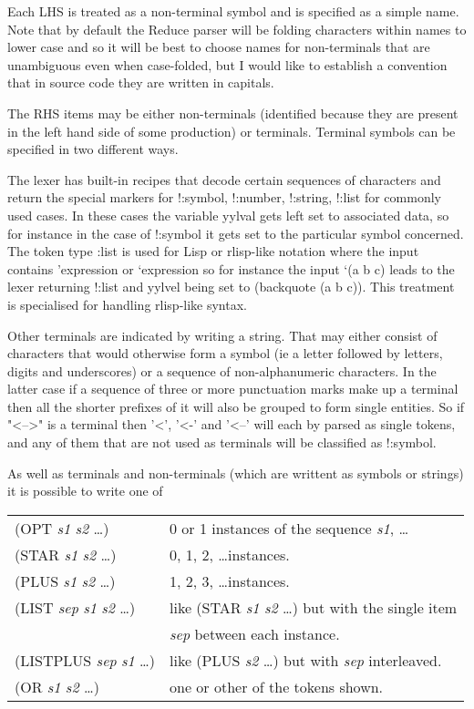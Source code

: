 Each LHS is treated as a non-terminal symbol and is specified as a simple
name. Note that by default the Reduce parser will be folding characters
within names to lower case and so it will be best to choose names for
non-terminals that are unambiguous even when case-folded, but I would like
to establish a convention that in source code they are written in capitals.

The RHS items may be either non-terminals (identified because they are
present in the left hand side of some production) or terminals. Terminal
symbols can be specified in two different ways.

The lexer has built-in recipes that decode certain sequences of characters
and return the special markers for !:symbol, !:number, !:string, !:list for
commonly used cases. In these cases the variable yylval gets left set
to associated data, so for instance in the case of !:symbol it gets set
to the particular symbol concerned.
The token type :list is used for Lisp or rlisp-like notation where the
input contains
    'expression
or  `expression
so for instance the input `(a b c) leads to the lexer returning !:list and
yylvel being set to (backquote (a b c)). This treatment is specialised for
handling rlisp-like syntax.

Other terminals are indicated by writing a string. That may either
consist of characters that would otherwise form a symbol (ie a letter
followed by letters, digits and underscores) or a sequence of
non-alphanumeric characters. In the latter case if a sequence of three or
more punctuation marks make up a terminal then all the shorter prefixes
of it will also be grouped to form single entities. So if "<-->" is a
terminal then '<', '<-' and '<--' will each by parsed as single tokens, and
any of them that are not used as terminals will be classified as !:symbol.

As well as terminals and non-terminals (which are writtent as symbols or
strings) it is possible to write one of

\begin{tabular}{l l}
    ({\ttfamily OPT} \textit{s1} \textit{s2} \ldots)      &     0 or 1 instances of the sequence \textit{s1}, \ldots \\
    ({\ttfamily STAR} \textit{s1} \textit{s2} \ldots)     &     0, 1, 2, \ldots instances. \\
    ({\ttfamily PLUS} \textit{s1} \textit{s2} \ldots)     &     1, 2, 3, \ldots instances. \\
    ({\ttfamily LIST} \textit{sep} \textit{s1} \textit{s2} \ldots) &     like ({\ttfamily STAR} \textit{s1} \textit{s2} \ldots) but with the single item \\
                            &     \textit{sep} between each instance. \\
    ({\ttfamily LISTPLUS} \textit{sep} \textit{s1} \ldots) &    like ({\ttfamily PLUS} \textit{s2} \ldots) but with \textit{sep} interleaved. \\
    ({\ttfamily OR} \textit{s1} \textit{s2} \ldots)        &    one or other of the tokens shown.
\end{tabular}

